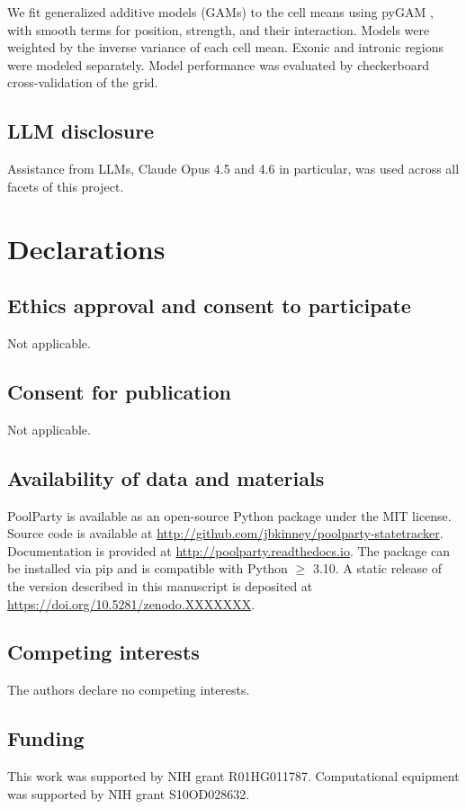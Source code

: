 \documentclass[twoside]{kinneylab_preprintstyle}
\begin{document}
We fit generalized additive models (GAMs) to the cell means using pyGAM \citep{Serven2018pg}, with smooth terms for position, strength, and their interaction. Models were weighted by the inverse variance of each cell mean. Exonic and intronic regions were modeled separately. Model performance was evaluated by checkerboard cross-validation of the grid.

\subsection{LLM disclosure}
Assistance from LLMs, Claude Opus 4.5 and 4.6 in particular, was used across all facets of this project.

\section*{Declarations}

\subsection*{Ethics approval and consent to participate}
Not applicable.

\subsection*{Consent for publication}
Not applicable.

\subsection*{Availability of data and materials}
PoolParty is available as an open-source Python package under the MIT license. Source code is available at \url{http://github.com/jbkinney/poolparty-statetracker}. Documentation is provided at \url{http://poolparty.readthedocs.io}. The package can be installed via pip and is compatible with Python $\geq$ 3.10. A static release of the version described in this manuscript is deposited at \url{https://doi.org/10.5281/zenodo.XXXXXXX}.

\subsection*{Competing interests}
The authors declare no competing interests.

\subsection*{Funding}
This work was supported by NIH grant R01HG011787. Computational equipment was supported by NIH grant S10OD028632.
\end{document}
